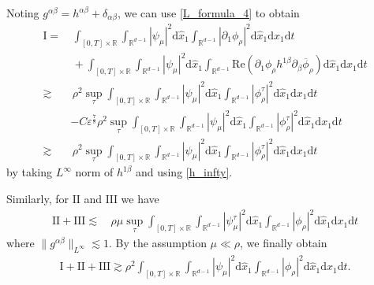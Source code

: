 \documentclass[11pt,letterpaper,reqno]{amsart}
\numberwithin{equation}{section}
\theoremstyle{definition}
\theoremstyle{remark}
\begin{document}
Noting $  g^{\alpha \beta}= h^{\alpha \beta} +\delta_{\alpha \beta}  $, we can  use \eqref{L_formula_4} to obtain
\begin{align*}
	\mathrm{I}=&\, \int_{[0,T]\times \mathbb{R}} \int_{\mathbb{R}^{d-1}} |\psi_\mu |^2  	\mathrm{d} \widehat{x}_1 \int_{\mathbb{R}^{d-1}} |\partial_{1} \phi_\rho |^2 \mathrm{d} \widehat{x}_1 \mathrm{ d} x_1 \mathrm{ d} t\nonumber\\
	&\,	+ \int_{[0,T]\times \mathbb{R}} \int_{\mathbb{R}^{d-1}} |\psi_\mu |^2  	\mathrm{d} \widehat{x}_1 \int_{\mathbb{R}^{d-1}} \mathrm{Re} (\partial_{1} \phi_\rho   h^{1 \beta} \partial_{\beta} \overline{\phi}_{\rho} ) \mathrm{d} \widehat{x}_1 \mathrm{ d} x_1 \mathrm{ d} t\nonumber\\
\gtrsim &\,  \rho^2  \sup_{\tau}\int_{[0,T]\times \mathbb{R}} \int_{\mathbb{R}^{d-1}} |\psi_\mu |^2  \mathrm{d} \widehat{x}_1 \int_{\mathbb{R}^{d-1}} |  \phi_\rho^\tau |^2 \mathrm{d} \widehat{x}_1 \mathrm{ d} x_1 \mathrm{ d} t\\
	&- C\varepsilon^{\frac78} \rho^2 \sup_{\tau}\int_{[0,T]\times \mathbb{R}} \int_{\mathbb{R}^{d-1}} |\psi_\mu |^2  	\mathrm{d} \widehat{x}_1 \int_{\mathbb{R}^{d-1}} | \phi_\rho^\tau |^2 \mathrm{d} \widehat{x}_1 \mathrm{ d} x_1 \mathrm{ d} t \\
    \gtrsim &\,   \rho^2 \sup_{\tau} \int_{[0,T]\times \mathbb{R}} \int_{\mathbb{R}^{d-1}} |\psi_\mu  |^2  	\mathrm{d} \widehat{x}_1 \int_{\mathbb{R}^{d-1}} |  \phi_\rho^\tau |^2 \mathrm{d} \widehat{x}_1 \mathrm{ d} x_1 \mathrm{ d} t
\end{align*}
by taking \(L^\infty\) norm of \(h^{1 \beta} \)  and using \eqref{h_infty}.

Similarly, for $\mathrm{II}$ and $ \mathrm{III}$ we have
\begin{align*}
	\mathrm{II} +
	\mathrm{III}  
    \lesssim  
	 &\,    \rho\mu  \sup_{\tau} \int_{[0,T]\times \mathbb{R}} \int_{\mathbb{R}^{d-1}} |\psi_\mu^\tau  |^2  	\mathrm{d} \widehat{x}_1 \int_{\mathbb{R}^{d-1}} |  \phi_\rho |^2 \mathrm{d} \widehat{x}_1 \mathrm{ d} x_1 \mathrm{ d} t
\end{align*}
where \( \| g^{\alpha \beta} \|_{L^\infty}  \lesssim 1.\)   By the assumption \( \mu \ll \rho\), we finally  obtain 
\begin{align} \label{Bie1}
	\mathrm{I}+\mathrm{II}+\mathrm{III}\gtrsim  \rho^2 \int_{[0,T]\times \mathbb{R}} \int_{\mathbb{R}^{d-1}}   \left|\psi_\mu\right|^2 	\mathrm{d} \widehat{x}_1 \int_{\mathbb{R}^{d-1}} | \phi_\rho |^2 \mathrm{d} \widehat{x}_1 \mathrm{ d} x_1 \mathrm{ d} t.
\end{align} 
\end{document}
